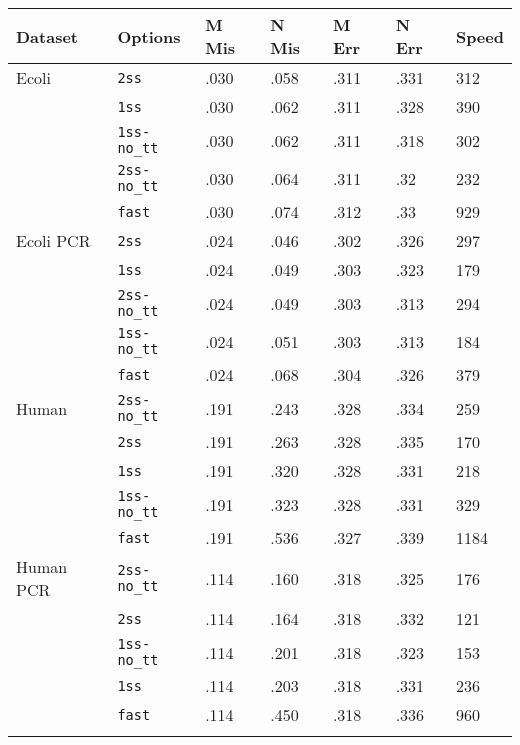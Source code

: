 \documentclass{bioinfo}
\begin{document}
\begin{table}[!t]
{
\begin{tabular}{@{}lllllll@{}}
\toprule
Dataset & Options & M Mis & N Mis & M Err & N Err & Speed \\
\midrule
Ecoli &  \texttt{2ss}         &  .030  &  .058  &  .311  &  .331  &  312   \\
&  \texttt{1ss}         &  .030  &  .062  &  .311  &  .328  &  390   \\
&  \texttt{1ss-no\_tt}  &  .030  &  .062  &  .311  &  .318  &  302   \\
&  \texttt{2ss-no\_tt}  &  .030  &  .064  &  .311  &  .32   &  232   \\
&  \texttt{fast}        &  .030  &  .074  &  .312  &  .33   &  929   \\
\midrule
Ecoli PCR &  \texttt{2ss}         &  .024  &  .046  &  .302  &  .326  &  297   \\
&  \texttt{1ss}         &  .024  &  .049  &  .303  &  .323  &  179   \\
&  \texttt{2ss-no\_tt}  &  .024  &  .049  &  .303  &  .313  &  294   \\
&  \texttt{1ss-no\_tt}  &  .024  &  .051  &  .303  &  .313  &  184   \\
&  \texttt{fast}        &  .024  &  .068  &  .304  &  .326  &  379   \\
\midrule
Human &  \texttt{2ss-no\_tt}  &  .191  &  .243  &  .328  &  .334  &  259   \\
&  \texttt{2ss}         &  .191  &  .263  &  .328  &  .335  &  170   \\
&  \texttt{1ss}         &  .191  &  .320  &  .328  &  .331  &  218   \\
&  \texttt{1ss-no\_tt}  &  .191  &  .323  &  .328  &  .331  &  329   \\
&  \texttt{fast}        &  .191  &  .536  &  .327  &  .339  &  1184  \\
\midrule
Human PCR &  \texttt{2ss-no\_tt}  &  .114  &  .160  &  .318  &  .325  &  176   \\
&  \texttt{2ss}         &  .114  &  .164  &  .318  &  .332  &  121   \\
&  \texttt{1ss-no\_tt}  &  .114  &  .201  &  .318  &  .323  &  153   \\
&  \texttt{1ss}         &  .114  &  .203  &  .318  &  .331  &  236   \\
&  \texttt{fast}        &  .114  &  .450  &  .318  &  .336  &  960   \\
\botrule
\end{tabular}
}
{}
\end{table}
\end{document}
